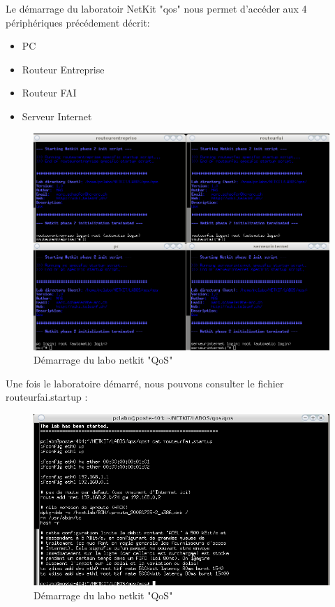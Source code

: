 \documentclass{article}
\begin{document}
Le démarrage du laboratoir NetKit "qos" nous permet d'accéder aux 4 périphériques précédement décrit:
\begin{itemize}
	\item PC
	\item Routeur Entreprise
	\item Routeur FAI
	\item Serveur Internet
\end{itemize}
\begin{figure}[h]
  \includegraphics[width=\linewidth]{./captures/1-start.png}
  \caption{Démarrage du labo netkit "QoS"}
  \label{fig:qos}
\end{figure}

\newpage
Une fois le laboratoire démarré, nous pouvons consulter le fichier routeurfai.startup :
\begin{figure}[h]
  \includegraphics[width=\linewidth]{./captures/2-RouteurfaiStartup.png}
  \caption{Démarrage du labo netkit "QoS"}
  \label{fig:token-bucket}
\end{figure}
\end{document}
